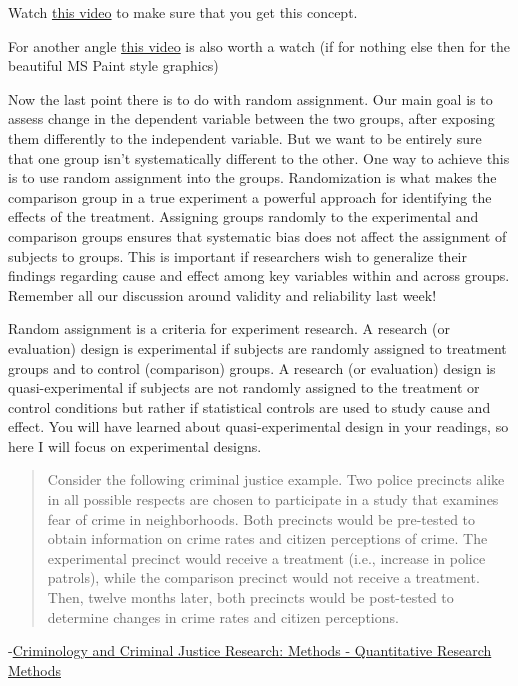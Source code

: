\documentclass[]{book}
\theoremstyle{definition}
\theoremstyle{definition}
\theoremstyle{definition}
\theoremstyle{remark}
\begin{document}
Watch \href{https://www.youtube.com/watch?v=igm0oanTFJI}{this video} to
make sure that you get this concept.

For another angle
\href{https://www.youtube.com/watch?v=aLesk8fujH8}{this video} is also
worth a watch (if for nothing else then for the beautiful MS Paint style
graphics)

Now the last point there is to do with random assignment. Our main goal
is to assess change in the dependent variable between the two groups,
after exposing them differently to the independent variable. But we want
to be entirely sure that one group isn't systematically different to the
other. One way to achieve this is to use random assignment into the
groups. Randomization is what makes the comparison group in a true
experiment a powerful approach for identifying the effects of the
treatment. Assigning groups randomly to the experimental and comparison
groups ensures that systematic bias does not affect the assignment of
subjects to groups. This is important if researchers wish to generalize
their findings regarding cause and effect among key variables within and
across groups. Remember all our discussion around validity and
reliability last week!

Random assignment is a criteria for experiment research. A research (or
evaluation) design is experimental if subjects are randomly assigned to
treatment groups and to control (comparison) groups. A research (or
evaluation) design is quasi-experimental if subjects are not randomly
assigned to the treatment or control conditions but rather if
statistical controls are used to study cause and effect. You will have
learned about quasi-experimental design in your readings, so here I will
focus on experimental designs.

\begin{quote}
Consider the following criminal justice example. Two police precincts
alike in all possible respects are chosen to participate in a study that
examines fear of crime in neighborhoods. Both precincts would be
pre-tested to obtain information on crime rates and citizen perceptions
of crime. The experimental precinct would receive a treatment (i.e.,
increase in police patrols), while the comparison precinct would not
receive a treatment. Then, twelve months later, both precincts would be
post-tested to determine changes in crime rates and citizen perceptions.
\end{quote}

-\href{http://law.jrank.org/pages/923/Criminology-Criminal-Justice-Research-Methods-Quantitative-research-methods.html}{Criminology
and Criminal Justice Research: Methods - Quantitative Research Methods}
\end{document}
